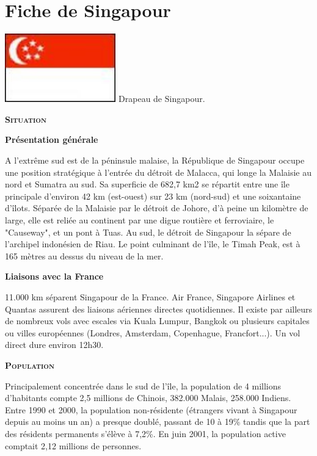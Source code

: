 \section{Fiche de Singapour}

\begin{multicols}{2}

\hspace*{-0.65cm}
\includegraphics[width=4.8cm]{articles/Fiche-de-singapour/1210328633arj0.jpg}
Drapeau de Singapour.


\textbf{\textsc{Situation}}

\textbf{Présentation générale}

A l'extrême sud est de la péninsule malaise, la République de Singapour occupe une position stratégique à l'entrée du détroit de Malacca, qui longe la Malaisie au nord et Sumatra au sud. Sa superficie de 682,7 km2 se répartit entre une île principale d'environ 42 km (est-ouest) sur 23 km (nord-sud) et une soixantaine d'îlots. Séparée de la Malaisie par le détroit de Johore, d'à peine un kilomètre de large, elle est reliée au continent par une digue routière et ferroviaire, le "Causeway", et un pont à Tuas. Au sud, le détroit de Singapour la sépare de l'archipel indonésien de Riau. Le point culminant de l'île, le Timah Peak, est à 165 mètres au dessus du niveau de la mer.

\textbf{Liaisons avec la France}

11.000 km séparent Singapour de la France. Air France, Singapore Airlines et Quantas assurent des liaisons aériennes directes quotidiennes. Il existe par ailleurs de nombreux vols avec escales via Kuala Lumpur, Bangkok ou plusieurs capitales ou villes européennes (Londres, Amsterdam, Copenhague, Francfort...). Un vol direct dure environ 12h30.

\textbf{\textsc{Population}}

Principalement concentrée dans le sud de l'île, la population de 4 millions d'habitants compte 2,5 millions de Chinois, 382.000 Malais, 258.000 Indiens. Entre 1990 et 2000, la population non-résidente (étrangers vivant à Singapour depuis au moins un an) a presque doublé, passant de 10 à 19\% tandis que la part des résidents permanents s'élève à 7,2\%. En juin 2001, la population active comptait 2,12 millions de personnes.


\end{multicols}
